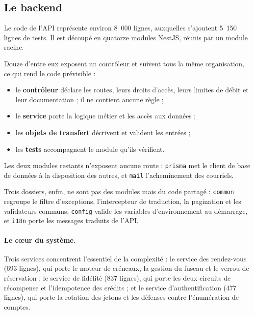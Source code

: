 \subsection{Le backend}

Le code de l'API représente environ 8~000 lignes, auxquelles s'ajoutent 5~150
lignes de tests. Il est découpé en quatorze modules NestJS, réunis par un
module racine.


Douze d'entre eux exposent un contrôleur et suivent tous la même organisation,
ce qui rend le code prévisible :

\begin{itemize}[leftmargin=1.2cm]
  \item le \textbf{contrôleur} déclare les routes, leurs droits d'accès, leurs
  limites de débit et leur documentation ; il ne contient aucune règle ;
  \item le \textbf{service} porte la logique métier et les accès aux données ;
  \item les \textbf{objets de transfert} décrivent et valident les entrées ;
  \item les \textbf{tests} accompagnent le module qu'ils vérifient.
\end{itemize}

Les deux modules restants n'exposent aucune route : \texttt{prisma} met le
client de base de données à la disposition des autres, et \texttt{mail}
l'acheminement des courriels.

Trois dossiers, enfin, ne sont pas des modules mais du code partagé :
\texttt{common} regroupe le filtre d'exceptions, l'intercepteur de traduction,
la pagination et les validateurs communs, \texttt{config} valide les variables
d'environnement au démarrage, et \texttt{i18n} porte les messages traduits de
l'API.

\paragraph{Le c\oe ur du système.} Trois services concentrent l'essentiel de la
complexité : le service des rendez-vous (693 lignes), qui porte le moteur de
créneaux, la gestion du fuseau et le verrou de réservation ; le service de
fidélité (837 lignes), qui porte les deux circuits de récompense et
l'idempotence des crédits ; et le service d'authentification (477 lignes), qui
porte la rotation des jetons et les défenses contre l'énumération de comptes.

